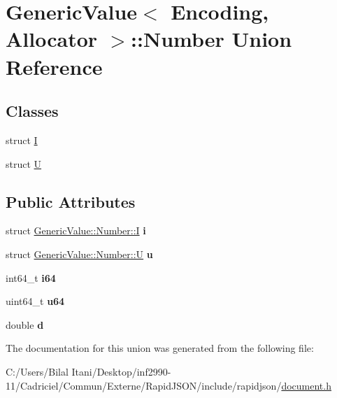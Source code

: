 \hypertarget{union_generic_value_1_1_number}{}\section{Generic\+Value$<$ Encoding, Allocator $>$\+:\+:Number Union Reference}
\label{union_generic_value_1_1_number}
\subsection*{Classes}
\begin{DoxyCompactItemize}
\item 
struct \hyperlink{struct_generic_value_1_1_number_1_1_i}{I}
\item 
struct \hyperlink{struct_generic_value_1_1_number_1_1_u}{U}
\end{DoxyCompactItemize}
\subsection*{Public Attributes}
\begin{DoxyCompactItemize}
\item 
struct \hyperlink{struct_generic_value_1_1_number_1_1_i}{Generic\+Value\+::\+Number\+::I} {\bfseries i}\hypertarget{union_generic_value_1_1_number_a0593fffc72a240979606668179e94436}{}\label{union_generic_value_1_1_number_a0593fffc72a240979606668179e94436}

\item 
struct \hyperlink{struct_generic_value_1_1_number_1_1_u}{Generic\+Value\+::\+Number\+::U} {\bfseries u}\hypertarget{union_generic_value_1_1_number_a3b5f0986718c830b88d641491248131d}{}\label{union_generic_value_1_1_number_a3b5f0986718c830b88d641491248131d}

\item 
int64\+\_\+t {\bfseries i64}\hypertarget{union_generic_value_1_1_number_ae53d96a8ead92099541da3b71633b77b}{}\label{union_generic_value_1_1_number_ae53d96a8ead92099541da3b71633b77b}

\item 
uint64\+\_\+t {\bfseries u64}\hypertarget{union_generic_value_1_1_number_a1c8d3c6d226cf74315e233b30b622430}{}\label{union_generic_value_1_1_number_a1c8d3c6d226cf74315e233b30b622430}

\item 
double {\bfseries d}\hypertarget{union_generic_value_1_1_number_a7ca3ad492fff303586d241eb0d17c242}{}\label{union_generic_value_1_1_number_a7ca3ad492fff303586d241eb0d17c242}

\end{DoxyCompactItemize}


The documentation for this union was generated from the following file\+:\begin{DoxyCompactItemize}
\item 
C\+:/\+Users/\+Bilal Itani/\+Desktop/inf2990-\/11/\+Cadriciel/\+Commun/\+Externe/\+Rapid\+J\+S\+O\+N/include/rapidjson/\hyperlink{document_8h}{document.\+h}\end{DoxyCompactItemize}
